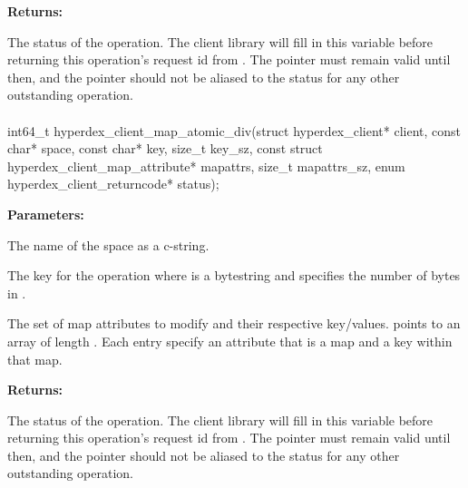 \noindent\textbf{Returns:}
\begin{description}[labelindent=\widthof{{\code{status}}},leftmargin=*,noitemsep,nolistsep,align=right]
\item[\code{status}] The status of the operation.  The client library will fill in this variable before returning this operation's request id from .  The pointer must remain valid until then, and the pointer should not be aliased to the status for any other outstanding operation.
\end{description}

\paragraph{}
\label{api:c:map_atomic_div}
\begin{ccode}
int64_t hyperdex_client_map_atomic_div(struct hyperdex_client* client,
        const char* space,
        const char* key, size_t key_sz,
        const struct hyperdex_client_map_attribute* mapattrs, size_t mapattrs_sz,
        enum hyperdex_client_returncode* status);
\end{ccode}
\funcdesc 

\noindent\textbf{Parameters:}
\begin{description}[labelindent=\widthof{{\code{mapattrs}, \code{mapattrs\_sz}}},leftmargin=*,noitemsep,nolistsep,align=right]
\item[\code{space}] The name of the space as a c-string.
\item[\code{key}, \code{key\_sz}] The key for the operation where  is a bytestring and  specifies the number of bytes in .
\item[\code{mapattrs}, \code{mapattrs\_sz}] The set of map attributes to modify and their respective key/values.   points to an array of length .  Each entry specify an attribute that is a map and a key within that map.
\end{description}

\noindent\textbf{Returns:}
\begin{description}[labelindent=\widthof{{\code{status}}},leftmargin=*,noitemsep,nolistsep,align=right]
\item[\code{status}] The status of the operation.  The client library will fill in this variable before returning this operation's request id from .  The pointer must remain valid until then, and the pointer should not be aliased to the status for any other outstanding operation.
\end{description}

